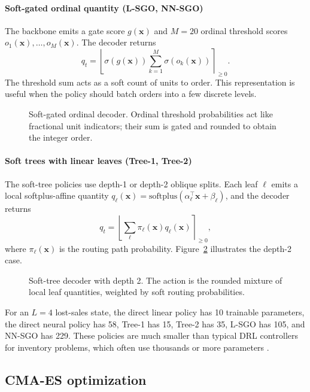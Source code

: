 \documentclass[authoryear,11pt]{elsarticle}
\begin{document}
\paragraph{Soft-gated ordinal quantity (L-SGO, NN-SGO)}
The backbone emits a gate score $g(\mathbf x)$ and $M=20$ ordinal threshold scores $o_1(\mathbf x),\dots,o_M(\mathbf x)$. The decoder returns
\[
q_t=\left\lfloor \sigma(g(\mathbf x))\sum_{k=1}^{M}\sigma(o_k(\mathbf x)) \right\rceil_{\ge0}.
\]
The threshold sum acts as a soft count of units to order. This representation is useful when the policy should batch orders into a few discrete levels.

\begin{figure}[H]
\centering
\SoftGatedOrdinalDecoderFigure
\caption{Soft-gated ordinal decoder. Ordinal threshold probabilities act like fractional unit indicators; their sum is gated and rounded to obtain the integer order.}
\label{fig:decoder-ordinal}
\end{figure}

\paragraph{Soft trees with linear leaves (Tree-1, Tree-2)}
The soft-tree policies use depth-1 or depth-2 oblique splits. Each leaf $\ell$ emits a local softplus-affine quantity $q_\ell(\mathbf x)=\mathrm{softplus}(\alpha_\ell^\top\mathbf x+\beta_\ell)$, and the decoder returns
\[
q_t=\left\lfloor \sum_\ell \pi_\ell(\mathbf x)q_\ell(\mathbf x) \right\rceil_{\ge0},
\]
where $\pi_\ell(\mathbf x)$ is the routing path probability. Figure~\ref{fig:decoder-tree} illustrates the depth-2 case.

\begin{figure}[H]
\centering
\SoftTreeFigure
\caption{Soft-tree decoder with depth 2. The action is the rounded mixture of local leaf quantities, weighted by soft routing probabilities.}
\label{fig:decoder-tree}
\end{figure}

For an $L=4$ lost-sales state, the direct linear policy has 10 trainable parameters, the direct neural policy has 58, Tree-1 has 15, Tree-2 has 35, L-SGO has 105, and NN-SGO has 229. These policies are much smaller than typical DRL controllers for inventory problems, which often use thousands or more parameters \citep{gijsbrechts2022drl,kaynov2024owmr}.

\subsection{CMA-ES optimization}
\end{document}
